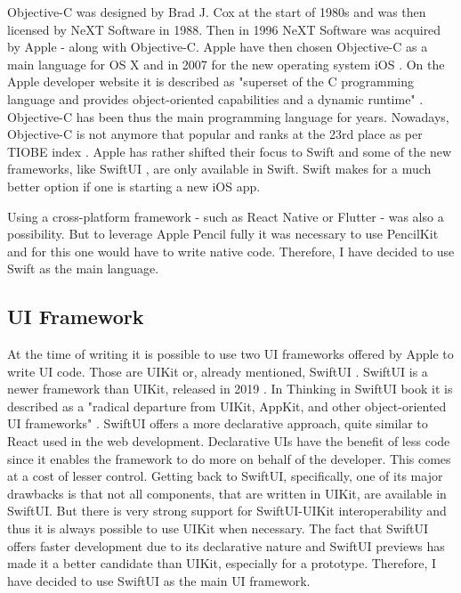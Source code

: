 Objective-C was designed by Brad J. Cox at the start of 1980s and was then licensed by NeXT Software in 1988. Then in 1996 NeXT Software was acquired by Apple - along with Objective-C. Apple have then chosen Objective-C as a main language for OS X and in 2007 for the new operating system iOS \cite{objective-c-programming}. On the Apple developer website it is described as "superset of the C programming language and provides object-oriented capabilities and a dynamic runtime" \cite{objective-c}. Objective-C has been thus the main programming language for years. Nowadays, Objective-C is not anymore that popular and ranks at the 23rd place as per TIOBE index \cite{tiobe-index}. Apple has rather shifted their focus to Swift and some of the new frameworks, like SwiftUI \cite{swiftui}, are only available in Swift. Swift makes for a much better option if one is starting a new iOS app.

Using a cross-platform framework - such as React Native \cite{react-native} or Flutter \cite{flutter} - was also a possibility. But to leverage Apple Pencil fully it was necessary to use PencilKit \cite{pencilkit} and for this one would have to write native code. Therefore, I have decided to use Swift as the main language.

\subsection{UI Framework}

At the time of writing it is possible to use two UI frameworks offered by Apple to write UI code. Those are UIKit \cite{uikit} or, already mentioned, SwiftUI \cite{swiftui}. SwiftUI is a newer framework than UIKit, released in 2019 \cite{swiftui-release}. In Thinking in SwiftUI book it is described as a "radical departure from UIKit, AppKit, and other object-oriented UI frameworks" \cite{thinking-in-swiftui}. SwiftUI offers a more declarative approach, quite similar to React \cite{react} used in the web development. Declarative UIs have the benefit of less code since it enables the framework to do more on behalf of the developer. This comes at a cost of lesser control. Getting back to SwiftUI, specifically, one of its major drawbacks is that not all components, that are written in UIKit, are available in SwiftUI. But there is very strong support for SwiftUI-UIKit interoperability \cite{swiftui-interop} and thus it is always possible to use UIKit when necessary. The fact that SwiftUI offers faster development due to its declarative nature and SwiftUI previews \cite{swiftui-preview} has made it a better candidate than UIKit, especially for a prototype. Therefore, I have decided to use SwiftUI as the main UI framework.

